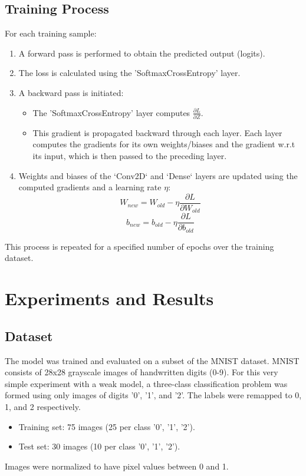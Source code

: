 \documentclass[conference]{IEEEtran}
\begin{document}
\subsection{Training Process}
For each training sample:
\begin{enumerate}
    \item A forward pass is performed to obtain the predicted output (logits).
    \item The loss is calculated using the 'SoftmaxCrossEntropy' layer.
    \item A backward pass is initiated:
        \begin{itemize}
            \item The 'SoftmaxCrossEntropy' layer computes $\frac{\partial L}{\partial Z}$.
            \item This gradient is propagated backward through each layer. Each layer computes the gradients for its own weights/biases and the gradient w.r.t its input, which is then passed to the preceding layer.
        \end{itemize}
    \item Weights and biases of the `Conv2D` and `Dense` layers are updated using the computed gradients and a learning rate $\eta$:
    \[ W_{new} = W_{old} - \eta \frac{\partial L}{\partial W_{old}} \]
    \[ b_{new} = b_{old} - \eta \frac{\partial L}{\partial b_{old}} \]
\end{enumerate}
This process is repeated for a specified number of epochs over the training dataset.

\section{Experiments and Results}

\subsection{Dataset}
The model was trained and evaluated on a subset of the MNIST dataset. MNIST consists of 28x28 grayscale images of handwritten digits (0-9). For this very simple experiment with a weak model, a three-class classification problem was formed using only images of digits '0', '1', and '2'. The labels were remapped to 0, 1, and 2 respectively.
\begin{itemize}
    \item Training set: 75 images (25 per class '0', '1', '2').
    \item Test set: 30 images (10 per class '0', '1', '2').
\end{itemize}
Images were normalized to have pixel values between 0 and 1.
\end{document}
